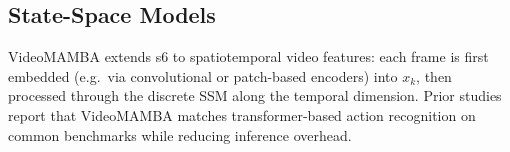\subsection{State-Space Models}
\label{ssec:state_space_models}


VideoMAMBA extends \acrshort{s6} to spatiotemporal video features: each frame is first embedded (e.g.\ via convolutional or patch-based encoders) into \(x_k\), then processed through the discrete SSM along the temporal dimension.  Prior studies \cite{lee_enhancing_mamba_s6_2024, li_videomamba_2024} report that VideoMAMBA matches transformer-based action recognition on common benchmarks while reducing inference overhead.

